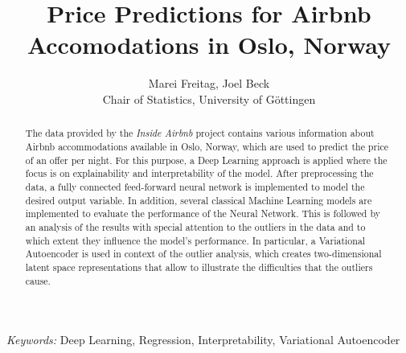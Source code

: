 \begin{titlepage}

    \title{\bf Price Predictions for Airbnb Accomodations in Oslo, Norway}

    \author{Marei Freitag, Joel Beck \hspace{.2cm}\\ Chair of Statistics, University of G\"ottingen\\}

    \maketitle

    \bigskip

    \begin{abstract}
        \noindent The data provided by the \emph{Inside Airbnb} project contains various information about Airbnb accommodations available in Oslo, Norway, which are used to predict the price of an offer per night.
        For this purpose, a Deep Learning approach is applied where the focus is on explainability and interpretability of the model. After preprocessing the data, a fully connected feed-forward neural network is implemented to model the desired output variable.
        In addition, several classical Machine Learning models are implemented to evaluate the performance of the Neural Network.
        This is followed by an analysis of the results with special attention to the outliers in the data and to which extent they influence the model's performance.
        In particular, a Variational Autoencoder is used in context of the outlier
        analysis, which creates two-dimensional latent space representations that allow to illustrate the difficulties that the outliers cause.
    \end{abstract}

    \noindent%
    {\it Keywords:}  Deep Learning, Regression, Interpretability, Variational Autoencoder
    \vfill

\end{titlepage}
